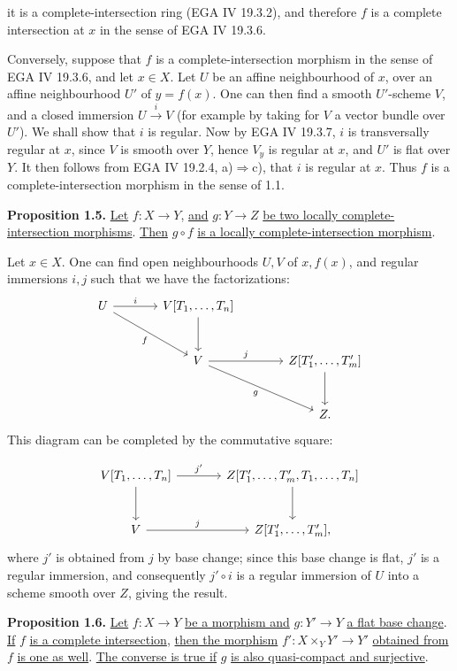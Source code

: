 %
it is a complete-intersection ring (EGA IV 19.3.2), and therefore $f$ is a complete intersection at $x$ in the sense of EGA IV 19.3.6.

Conversely, suppose that $f$ is a complete-intersection morphism in the sense of EGA IV 19.3.6, and let $x\in X$. Let $U$ be an affine neighbourhood of $x$, over an affine neighbourhood $U'$ of $y=f(x)$. One can then find a smooth $U'$-scheme $V$, and a closed immersion $U\xrightarrow{i}V$ (for example by taking for $V$ a vector bundle over $U'$). We shall show that $i$ is regular. Now by EGA IV 19.3.7, $i$ is transversally regular at $x$, since $V$ is smooth over $Y$, hence $V_y$ is regular at $x$, and $U'$ is flat over $Y$. It then follows from EGA IV 19.2.4, a)$\Rightarrow$c), that $i$ is regular at $x$. Thus $f$ is a complete-intersection morphism in the sense of 1.1.

\textbf{Proposition 1.5.} \uline{Let} $f:X\to Y$, \uline{and} $g:Y\to Z$ \uline{be two locally complete-intersection morphisms}. \uline{Then} $g\circ f$ \uline{is a locally complete-intersection morphism}.

Let $x\in X$. One can find open neighbourhoods $U,V$ of $x,f(x)$, and regular immersions $i,j$ such that we have the factorizations:
\[
\begin{tikzcd}[column sep=large,row sep=large]
U \arrow[r,"i"] \arrow[dr,"f"'] & V[T_1,\ldots,T_n] \arrow[d] &\\
& V \arrow[r,"j"] \arrow[dr,"g"'] & Z[T'_1,\ldots,T'_m] \arrow[d]\\
& & Z .
\end{tikzcd}
\]
This diagram can be completed by the commutative square:

%
\[
\begin{tikzcd}[column sep=large,row sep=large]
V[T_1,\ldots,T_n] \arrow[r,"j'"] \arrow[d] & Z[T'_1,\ldots,T'_m,T_1,\ldots,T_n] \arrow[d]\\
V \arrow[r,"j"] & Z[T'_1,\ldots,T'_m],
\end{tikzcd}
\]
where $j'$ is obtained from $j$ by base change; since this base change is flat, $j'$ is a regular immersion, and consequently $j'\circ i$ is a regular immersion of $U$ into a scheme smooth over $Z$, giving the result.

\textbf{Proposition 1.6.} \uline{Let} $f:X\to Y$ \uline{be a morphism and} $g:Y'\to Y$ \uline{a flat base change}. \uline{If} $f$ \uline{is a complete intersection}, \uline{then the morphism} $f':X\times_Y Y'\to Y'$ \uline{obtained from} $f$ \uline{is one as well}. \uline{The converse is true if} $g$ \uline{is also quasi-compact and surjective}.

